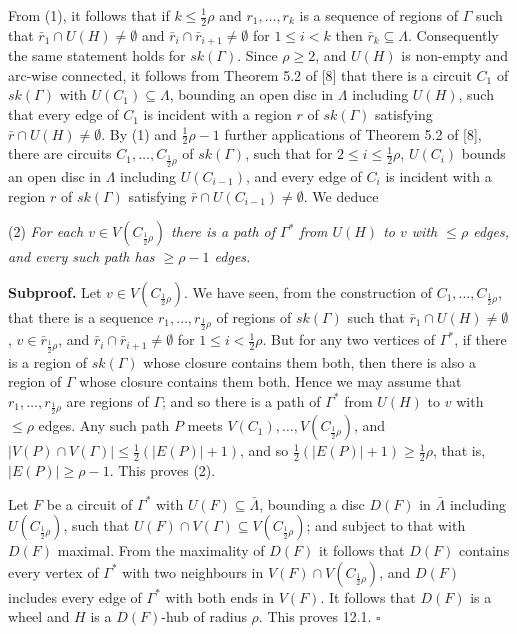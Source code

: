 From (1), it follows that if $k \le \frac{1}{2}\rho$ and $r_1, \dots, r_k$ is a sequence of regions of $\Gamma$ such that $\bar{r}_1 \cap U(H) \ne \emptyset$ and $\bar{r}_i \cap \bar{r}_{i+1} \ne \emptyset$ for $1 \le i < k$ then $\bar{r}_k \subseteq \Lambda$. Consequently the same statement holds for $sk(\Gamma)$. Since $\rho \ge 2$, and $U(H)$ is non-empty and arc-wise connected, it follows from Theorem 5.2 of [8] that there is a circuit $C_1$ of $sk(\Gamma)$ with $U(C_1) \subseteq \Lambda$, bounding an open disc in $\Lambda$ including $U(H)$, such that every edge of $C_1$ is incident with a region $r$ of $sk(\Gamma)$ satisfying $\bar{r} \cap U(H) \ne \emptyset$. By (1) and $\frac{1}{2}\rho - 1$ further applications of Theorem 5.2 of [8], there are circuits $C_1, \dots, C_{\frac{1}{2}\rho}$ of $sk(\Gamma)$, such that for $2 \le i \le \frac{1}{2}\rho$, $U(C_i)$ bounds an open disc in $\Lambda$ including $U(C_{i-1})$, and every edge of $C_i$ is incident with a region $r$ of $sk(\Gamma)$ satisfying $\bar{r} \cap U(C_{i-1}) \ne \emptyset$. We deduce

\hspace*{12pt}(2) \textit{For each $v \in V(C_{\frac{1}{2}\rho})$ there is a path of $\Gamma^*$ from $U(H)$ to $v$ with $\le \rho$ edges, and every such path has $\ge \rho - 1$ edges.}

\textbf{Subproof.} Let $v \in V(C_{\frac{1}{2}\rho})$. We have seen, from the construction of $C_1, \dots, C_{\frac{1}{2}\rho}$, that there is a sequence $r_1, \dots, r_{\frac{1}{2}\rho}$ of regions of $sk(\Gamma)$ such that $\bar{r}_1 \cap U(H) \ne \emptyset$, $v \in \bar{r}_{\frac{1}{2}\rho}$, and $\bar{r}_i \cap \bar{r}_{i+1} \ne \emptyset$ for $1 \le i < \frac{1}{2}\rho$. But for any two vertices of $\Gamma^*$, if there is a region of $sk(\Gamma)$ whose closure contains them both, then there is also a region of $\Gamma$ whose closure contains them both. Hence we may assume that $r_1, \dots, r_{\frac{1}{2}\rho}$ are regions of $\Gamma$; and so there is a path of $\Gamma^*$ from $U(H)$ to $v$ with $\le \rho$ edges. Any such path $P$ meets $V(C_1), \dots, V(C_{\frac{1}{2}\rho})$, and $|V(P) \cap V(\Gamma)| \le \frac{1}{2}(|E(P)| + 1)$, and so $\frac{1}{2}(|E(P)| + 1) \ge \frac{1}{2}\rho$, that is, $|E(P)| \ge \rho - 1$. This proves (2).

Let $F$ be a circuit of $\Gamma^*$ with $U(F) \subseteq \bar{\Lambda}$, bounding a disc $D(F)$ in $\bar{\Lambda}$ including $U(C_{\frac{1}{2}\rho})$, such that $U(F) \cap V(\Gamma) \subseteq V(C_{\frac{1}{2}\rho})$; and subject to that with $D(F)$ maximal. From the maximality of $D(F)$ it follows that $D(F)$ contains every vertex of $\Gamma^*$ with two neighbours in $V(F) \cap V(C_{\frac{1}{2}\rho})$, and $D(F)$ includes every edge of $\Gamma^*$ with both ends in $V(F)$. It follows that $D(F)$ is a wheel and $H$ is a $D(F)$-hub of radius $\rho$. This proves 12.1. $\square$

